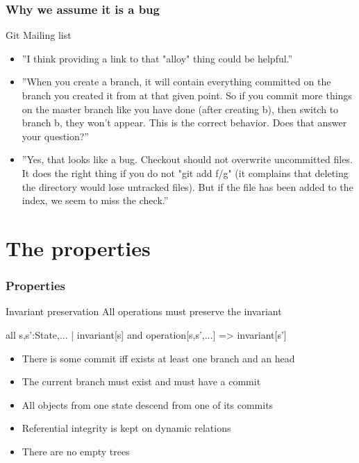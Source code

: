 \documentclass{beamer}
\begin{document}
\begin{frame}
   \frametitle{Why we assume it is a bug} \pause
   \begin{block}{Git Mailing list}
      \footnotesize
      \begin{itemize}
         \item ''I think providing a link to that "alloy" thing could
         be helpful.'' \pause
         \item ''When you create a branch, it will contain everything
         committed on the branch you created it from at that given
         point. So if you commit more things on the master branch like
         you have done (after creating b), then switch to branch b,
         they won't appear. This is the correct behavior. Does that
         answer your question?'' \pause
         \item ''Yes, that looks like a bug. Checkout should not
         overwrite uncommitted files. It does the right thing if you
         do not "git add f/g" (it complains that deleting the
         directory would lose untracked files). But if the file has
         been added to the index, we seem to miss the check.''
      \end{itemize}
   \end{block}
\end{frame}

\section{The properties}
\begin{frame}[fragile]
   \frametitle{Properties}
   \begin{block}{Invariant preservation}
      All operations must preserve the invariant
   \end{block}
   \vspace{0.1in}
   \scriptsize
all s,s':State,... | invariant[s] and operation[s,s',...] => invariant[s'] \\
   \normalsize
   \vspace{0.1in}
   \begin{itemize}
      \item There is some commit iff exists at least one branch and
      an head
      \item The current branch must exist and must have a commit
      \item All objects from one state descend from one of its commits
      \item Referential integrity is kept on dynamic relations
      \item There are no empty trees
   \end{itemize}

\end{frame}
\end{document}
